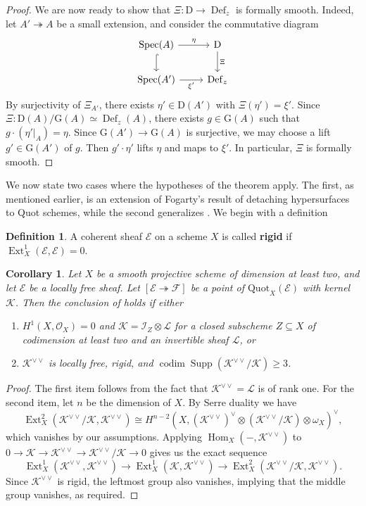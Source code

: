 \documentclass[leqno,11pt,a4paper]{amsart}
\newtheorem{cor}[cor]{Corollary}
\theoremstyle{definition}
\newtheorem{definition}[definition]{Definition}
\numberwithin{equation}{section}
\newcommand{\Quot}{\mathrm{Quot}}
\newcommand{\EE}{\mathscr{E}}
\newcommand{\FF}{\mathscr{F}}
\newcommand{\OO}{\mathscr{O}}
\newcommand{\II}{\mathscr{I}}
\newcommand{\KK}{\mathscr{K}}
\DeclareMathOperator{\Hom}{Hom}
\DeclareMathOperator{\Ext}{Ext}
\DeclareMathOperator{\Def}{Def}
\DeclareMathOperator{\Supp}{Supp}
\DeclareMathOperator{\codim}{codim}
\DeclareMathOperator{\Spec}{Spec}
\begin{document}
\begin{proof}
We are now ready to show that $\Xi: \mathrm{D} \to \Def_z$ is formally smooth. Indeed, let $A'\twoheadrightarrow A$ be a small extension, and consider the commutative diagram
\[
\begin{tikzcd}
\Spec(A) \arrow[r, "\eta"]
\arrow[d, hook] &
\mathrm{D} \arrow[d, "\Xi"] \\
\Spec(A') \arrow[r, "\xi'"'] &
\Def_z
\end{tikzcd}
\]
By surjectivity of $\Xi_{A'}$, there exists $\eta'\in \mathrm{D}(A')$ with $\Xi(\eta')=\xi'$.
Since $ \Xi: \mathrm{D}(A)/\mathrm{G}(A) \simeq \Def_z(A)$, there exists $g\in \mathrm{G}(A)$ such that $g\cdot(\eta'|_A)=\eta$.
Since $\mathrm{G}(A')\to \mathrm{G}(A)$ is surjective, we may choose a lift $g'\in \mathrm{G}(A')$ of $g$. Then $g'\cdot \eta'$ lifts $\eta$ and maps to $\xi'$. 
In particular, $\Xi$ is formally smooth.
\end{proof}



We now state two cases where the hypotheses of the theorem apply. 
The first, as mentioned earlier, is an extension of Fogarty's result of detaching hypersurfaces to Quot schemes, while the second generalizes \cite[Lemma 2.1(ii)]{Ricolfi}. 
We begin with a definition

\begin{definition} A coherent sheaf $\EE$ on a scheme $X$ is called \textbf{rigid} if $\Ext^1_X(\EE,\EE) = 0$.
\end{definition}

\begin{cor} \label{double_dual_cor}
Let $X$ be a smooth projective scheme of dimension at least two, and let $\EE$ be a locally free sheaf. Let $[\EE \twoheadrightarrow \FF]$ be a point of $\Quot_X(\EE)$ with kernel $\KK$. Then the conclusion of  holds if either
\begin{enumerate}
\item $H^1(X,\OO_X)=0$ and $\KK= \II_Z\otimes \mathscr{L}$ for a closed subscheme $Z\subseteq X$ of codimension at least two and an invertible sheaf $\mathscr{L}$, or
\item $\KK^{\vee\vee}$ is locally free, rigid, and $\codim \Supp(\KK^{\vee\vee}/\mathscr K) \geq 3$.
\end{enumerate}
\end{cor}
\begin{proof}
The first item follows from the fact that $\KK^{\vee\vee} = \mathscr{L}$ is of rank one. 
For the second item, let $n$ be the dimension of $X$. 
By Serre duality we have 
$$
\Ext^2_X(\KK^{\vee\vee}/\KK,\KK^{\vee\vee}) \cong H^{n-2}(X,(\KK^{\vee\vee})^\vee \otimes (\KK^{\vee\vee}/\KK)\otimes\omega_X)^{\vee},
$$
which vanishes by our assumptions. 
Applying $\Hom_X(-,\KK^{\vee\vee})$ to $0 \to \KK \to \KK^{\vee\vee} \to \KK^{\vee\vee}/ \KK \to 0$ gives us the exact sequence
$$
\Ext_X^1(\KK^{\vee\vee},\KK^{\vee\vee}) \to \Ext_X^1(\mathscr K,\KK^{\vee\vee}) \to \Ext_X^2(\KK^{\vee\vee}/\KK,\KK^{\vee\vee}).
$$ 
Since $\KK^{\vee\vee}$ is rigid, the leftmost group also vanishes, implying that the middle group vanishes, as required.
\end{proof}
\end{document}
